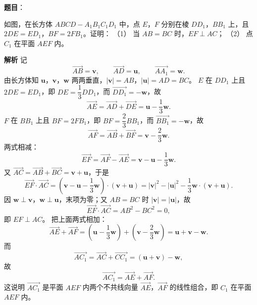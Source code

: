 \begin{answer}

\textbf{题目}：

如图，在长方体 $ABCD-A_1B_1C_1D_1$ 中，点 $E$，$F$ 分别在棱 $DD_1$，$BB_1$ 上，且 $2DE=ED_1$，$BF=2FB_1$。证明：
（1） 当 $AB=BC$ 时，$EF\perp AC$；
（2） 点 $C_1$ 在平面 $AEF$ 内。
\nopagebreak[4]
\begin{center}\end{center}
\nopagebreak[4]
\textbf{解析}
记
\nopagebreak[4]
\[\overrightarrow{AB}=\boldsymbol v,\qquad \overrightarrow{AD}=\boldsymbol u,\qquad \overrightarrow{AA_1}=\boldsymbol w .\]
由长方体知 $\boldsymbol u$，$\boldsymbol v$，$\boldsymbol w$ 两两垂直，$|\boldsymbol v|=AB$，$|\boldsymbol u|=AD=BC$。
$E$ 在 $DD_1$ 上且 $2DE=ED_1$，即 $DE=\dfrac13DD_1$，而 $\overrightarrow{DD_1}=-\boldsymbol w$，故
\nopagebreak[4]
\[\overrightarrow{AE}=\overrightarrow{AD}+\overrightarrow{DE}=\boldsymbol u-\frac13\boldsymbol w .\]
$F$ 在 $BB_1$ 上且 $BF=2FB_1$，即 $BF=\dfrac23BB_1$，而 $\overrightarrow{BB_1}=-\boldsymbol w$，故
\nopagebreak[4]
\[\overrightarrow{AF}=\overrightarrow{AB}+\overrightarrow{BF}=\boldsymbol v-\frac23\boldsymbol w .\]
两式相减：
\nopagebreak[4]
\[\overrightarrow{EF}=\overrightarrow{AF}-\overrightarrow{AE}=\boldsymbol v-\boldsymbol u-\frac13\boldsymbol w .\]
又 $\overrightarrow{AC}=\overrightarrow{AB}+\overrightarrow{BC}=\boldsymbol v+\boldsymbol u$，于是
\nopagebreak[4]
\[\overrightarrow{EF}\cdot\overrightarrow{AC}=\left(\boldsymbol v-\boldsymbol u-\frac13\boldsymbol w\right)\cdot(\boldsymbol v+\boldsymbol u)=|\boldsymbol v|^2-|\boldsymbol u|^2-\frac13\boldsymbol w\cdot(\boldsymbol v+\boldsymbol u) .\]
因 $\boldsymbol w\perp\boldsymbol v$，$\boldsymbol w\perp\boldsymbol u$，末项为零；又 $AB=BC$ 时 $|\boldsymbol v|=|\boldsymbol u|$，故
\nopagebreak[4]
\[\overrightarrow{EF}\cdot\overrightarrow{AC}=AB^2-BC^2=0,\]
即 $EF\perp AC$。
把上面两式相加：
\nopagebreak[4]
\[\overrightarrow{AE}+\overrightarrow{AF}=\left(\boldsymbol u-\frac13\boldsymbol w\right)+\left(\boldsymbol v-\frac23\boldsymbol w\right)=\boldsymbol u+\boldsymbol v-\boldsymbol w .\]
而
\nopagebreak[4]
\[\overrightarrow{AC_1}=\overrightarrow{AC}+\overrightarrow{CC_1}=(\boldsymbol u+\boldsymbol v)-\boldsymbol w,\]
故
\nopagebreak[4]
\[\overrightarrow{AC_1}=\overrightarrow{AE}+\overrightarrow{AF}.\]
这说明 $\overrightarrow{AC_1}$ 是平面 $AEF$ 内两个不共线向量 $\overrightarrow{AE}$，$\overrightarrow{AF}$ 的线性组合，即 $C_1$ 在平面 $AEF$ 内。



\end{answer}
